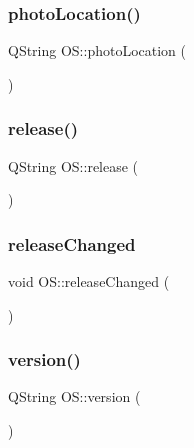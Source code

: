 \subsubsection{\texorpdfstring{photoLocation()}{photoLocation()}}
{\footnotesize\ttfamily Q\+String O\+S\+::photo\+Location (\begin{DoxyParamCaption}{ }\end{DoxyParamCaption})}

\mbox{\label{classOS_a1d00cd418f5d83cc174492326f7cd604}} 
\subsubsection{\texorpdfstring{release()}{release()}}
{\footnotesize\ttfamily Q\+String O\+S\+::release (\begin{DoxyParamCaption}{ }\end{DoxyParamCaption})}

\mbox{\label{classOS_a58369b88b24b1701b020bd0971d99c03}} 
\subsubsection{\texorpdfstring{releaseChanged}{releaseChanged}}
{\footnotesize\ttfamily void O\+S\+::release\+Changed (\begin{DoxyParamCaption}{ }\end{DoxyParamCaption})\hspace{0.3cm}{\ttfamily [signal]}}

\mbox{\label{classOS_a4cd043becb244d8f40bdcc55c0417a71}} 
\subsubsection{\texorpdfstring{version()}{version()}}
{\footnotesize\ttfamily Q\+String O\+S\+::version (\begin{DoxyParamCaption}{ }\end{DoxyParamCaption})}

\mbox{\label{classOS_a2bb282eb19c9eaa0c787dabc434a9fca}} 
